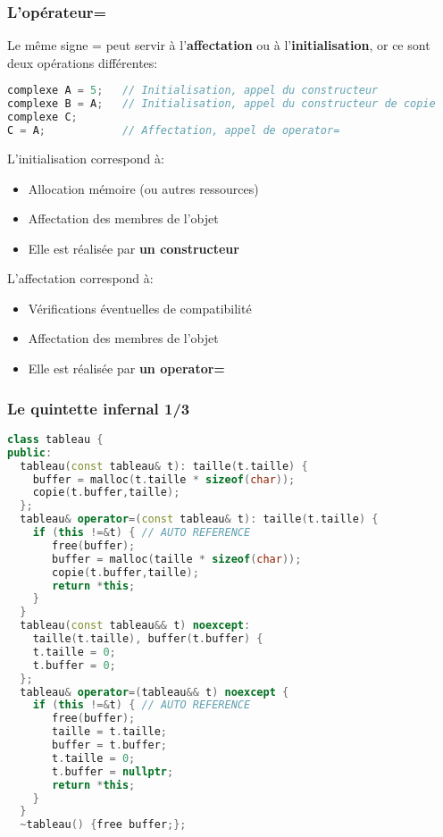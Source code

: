 \documentclass{beamer}
\begin{document}
\begin{frame}[fragile=singleslide,shrink=20]
\frametitle {L'opérateur=}

Le même signe = peut servir à l'\textbf{affectation} ou à l'\textbf{initialisation}, or ce sont deux opérations différentes:
\begin{lstlisting}[language=c++]
complexe A = 5;   // Initialisation, appel du constructeur
complexe B = A;   // Initialisation, appel du constructeur de copie
complexe C; 
C = A;            // Affectation, appel de operator=
\end{lstlisting}

L'initialisation correspond à:
\begin{itemize}
\item{Allocation mémoire (ou autres ressources)}
\item{Affectation des membres de l'objet}
\item{Elle est réalisée par \textbf{un constructeur}}
\end{itemize}

L'affectation correspond à:
\begin{itemize}
\item{Vérifications éventuelles de compatibilité}
\item{Affectation des membres de l'objet}
\item{Elle est réalisée par \textbf{un operator=}}
\end{itemize}

\end{frame}

\begin{frame}[fragile=singleslide,shrink=20]
\frametitle {Le quintette infernal 1/3}
\begin{lstlisting}[language=c++]
class tableau {
public:
  tableau(const tableau& t): taille(t.taille) {
    buffer = malloc(t.taille * sizeof(char));
    copie(t.buffer,taille);
  };
  tableau& operator=(const tableau& t): taille(t.taille) {
    if (this !=&t) { // AUTO REFERENCE
       free(buffer);
       buffer = malloc(taille * sizeof(char));
       copie(t.buffer,taille);
       return *this;
    }
  }
  tableau(const tableau&& t) noexcept: 
    taille(t.taille), buffer(t.buffer) {
    t.taille = 0;
    t.buffer = 0;
  };
  tableau& operator=(tableau&& t) noexcept {
    if (this !=&t) { // AUTO REFERENCE
       free(buffer);
       taille = t.taille;
       buffer = t.buffer;
       t.taille = 0;
       t.buffer = nullptr;
       return *this;
    }
  }
  ~tableau() {free buffer;};
\end{lstlisting}
\end{frame}
\end{document}
